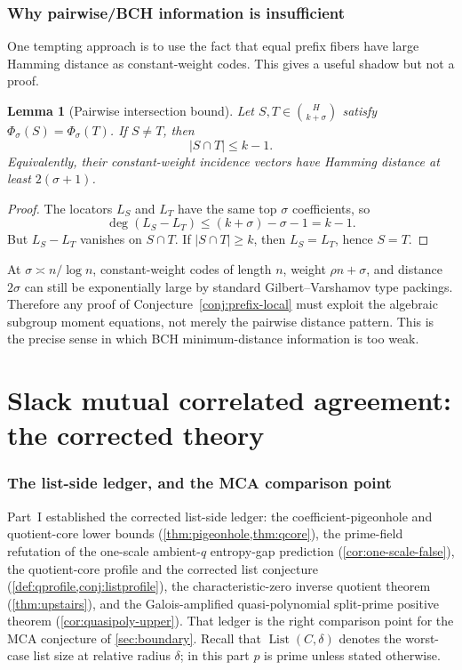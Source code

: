 \documentclass[11pt]{article}
\newtheorem{lemma}[lemma]{Lemma}
\theoremstyle{definition}
\newcommand{\Lst}{\operatorname{List}}
\begin{document}
\section{Why pairwise/BCH information is insufficient}\label{sec:pairwise}

One tempting approach is to use the fact that equal prefix fibers have large Hamming distance as constant-weight codes.  This gives a useful shadow but not a proof.

\begin{lemma}[Pairwise intersection bound]\label{lem:pairwise}
Let $S,T\in\binom H{k+\sigma}$ satisfy $\Phi_\sigma(S)=\Phi_\sigma(T)$.  If $S\ne T$, then
\[
        |S\cap T|\le k-1.
\]
Equivalently, their constant-weight incidence vectors have Hamming distance at least $2(\sigma+1)$.
\end{lemma}

\begin{proof}
The locators $L_S$ and $L_T$ have the same top $\sigma$ coefficients, so
\[
        \deg(L_S-L_T)\le (k+\sigma)-\sigma-1=k-1.
\]
But $L_S-L_T$ vanishes on $S\cap T$.  If $|S\cap T|\ge k$, then $L_S=L_T$, hence $S=T$.
\end{proof}

At $\sigma\asymp n/\log n$, constant-weight codes of length $n$, weight $\rho n+\sigma$, and distance $2\sigma$ can still be exponentially large by standard Gilbert--Varshamov type packings.  Therefore any proof of Conjecture~\ref{conj:prefix-local} must exploit the algebraic subgroup moment equations, not merely the pairwise distance pattern.  This is the precise sense in which BCH minimum-distance information is too weak.


\part{Slack mutual correlated agreement: the corrected theory}

\section{The list-side ledger, and the MCA comparison point}\label{sec:interface}

Part~I established the corrected list-side ledger: the coefficient-pigeonhole and quotient-core lower bounds (\cref{thm:pigeonhole,thm:qcore}), the prime-field refutation of the one-scale ambient-$q$ entropy-gap prediction (\cref{cor:one-scale-false}), the quotient-core profile and the corrected list conjecture (\cref{def:qprofile,conj:listprofile}), the characteristic-zero inverse quotient theorem (\cref{thm:upstairs}), and the Galois-amplified quasi-polynomial split-prime positive theorem (\cref{cor:quasipoly-upper}).  That ledger is the right comparison point for the MCA conjecture of \cref{sec:boundary}.  Recall that $\Lst(C,\delta)$ denotes the worst-case list size at relative radius $\delta$; in this part $p$ is prime unless stated otherwise.
\end{document}
